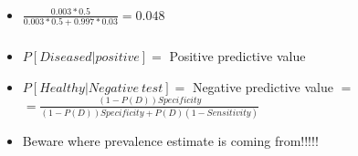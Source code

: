 \begin{frame}
\frametitle{}
\begin{itemize}
\item $\frac{\displaystyle 0.003 * 0.5}{\displaystyle 0.003 * 0.5 + 0.997 * 0.03} = 0.048$
\end{itemize}
\end{frame}

\begin{frame}
\frametitle{}
\begin{itemize}
\item $P\left[Diseased|positive\right] =$ Positive predictive value
\vspace*{15pt}
\item $P\left[Healthy|Negative\ test\right] =$ Negative predictive value $=$
$=\frac{(1 - P(D)) Specificity}{(1 - P(D)) Specificity + P(D) (1 - Sensitivity)}$
\vspace*{15pt}
\item Beware where prevalence estimate is coming
  from!!!!!
\end{itemize}
\end{frame}











